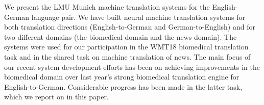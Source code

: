 We present the LMU Munich machine translation systems for the English-German language pair. We have built neural machine translation systems for both translation directions (English-to-German and German-to-English) and for two different domains (the biomedical domain and the news domain). The systems were used for our participation in the WMT18 biomedical translation task and in the shared task on machine translation of news. The main focus of our recent system development efforts has been on achieving improvements in the biomedical domain over last year's strong biomedical translation engine for English-to-German. Considerable progress has been made in the latter task, which we report on in this paper.
